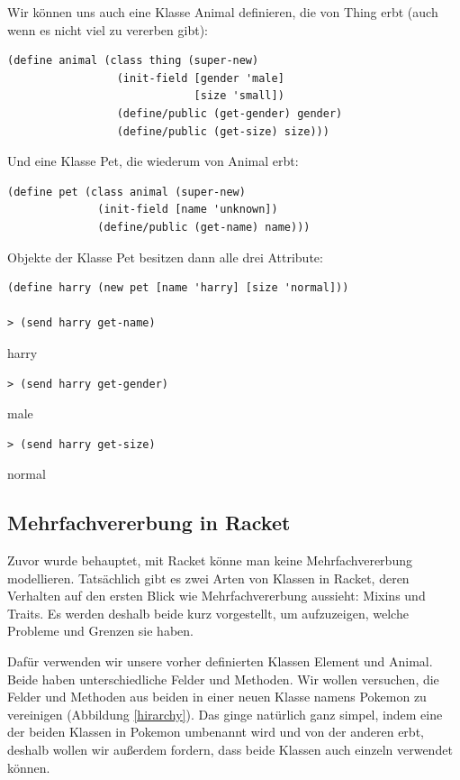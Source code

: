 Wir können uns auch eine Klasse Animal definieren, die von Thing erbt (auch wenn es nicht viel zu vererben gibt):

\begin{lstlisting}
(define animal (class thing (super-new)
                 (init-field [gender 'male]
                             [size 'small])
                 (define/public (get-gender) gender)
                 (define/public (get-size) size)))
\end{lstlisting} 

Und eine Klasse Pet, die wiederum von Animal erbt:

\begin{lstlisting}
(define pet (class animal (super-new)
              (init-field [name 'unknown])
              (define/public (get-name) name)))
\end{lstlisting} 

Objekte der Klasse Pet besitzen dann alle drei Attribute:

\begin{lstlisting}
(define harry (new pet [name 'harry] [size 'normal]))

> (send harry get-name)
\end{lstlisting} 
{\rsymbol harry}

\begin{lstlisting}
> (send harry get-gender)
\end{lstlisting} 
{\rsymbol male}

\begin{lstlisting}
> (send harry get-size)
\end{lstlisting} 
{\rsymbol normal}


\subsection{Mehrfachvererbung in Racket}
Zuvor wurde behauptet, mit Racket könne man keine Mehrfachvererbung modellieren. Tatsächlich gibt es zwei Arten von Klassen in Racket, deren Verhalten auf den ersten Blick wie Mehrfachvererbung aussieht: Mixins und Traits. Es werden deshalb beide kurz vorgestellt, um aufzuzeigen, welche Probleme und Grenzen sie haben.

Dafür verwenden wir unsere vorher definierten Klassen Element und Animal. Beide haben unterschiedliche Felder und Methoden. Wir wollen versuchen, die Felder und Methoden aus beiden in einer neuen Klasse namens Pokemon zu vereinigen (Abbildung \ref{hirarchy}). Das ginge natürlich ganz simpel, indem eine der beiden Klassen in Pokemon umbenannt wird und von der anderen erbt, deshalb wollen wir außerdem fordern, dass beide Klassen auch einzeln verwendet können. 

